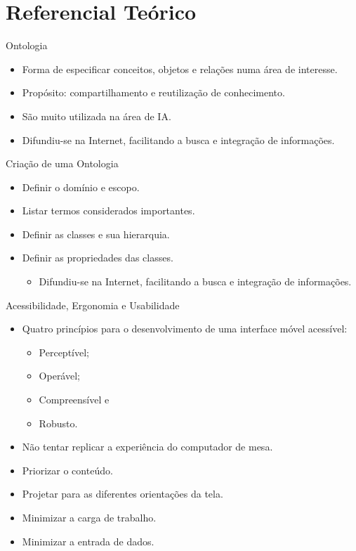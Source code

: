 \section{Referencial Teórico}\label{sec:referencial-teorico}
\begin{frame}[allowframebreaks]{Ontologia}
	\begin{itemize}
		\setlength{\itemsep}{0.5em}
		\item<1-> Forma de especificar conceitos, objetos e relações numa área de interesse.
		\item<1-> Propósito: compartilhamento e reutilização de conhecimento.
		\item<1-> São muito utilizada na área de IA.
		\item<1-> Difundiu-se na Internet, facilitando a busca e integração de informações.
	\end{itemize}
\end{frame}

\begin{frame}[allowframebreaks]{Criação de uma Ontologia}
	\begin{itemize}
		\setlength{\itemsep}{0.5em}
		\item<1-> Definir o domínio e escopo.
		\item<1-> Listar termos considerados importantes.
		\item<1-> Definir as classes e sua hierarquia.
		\item<1-> Definir as propriedades das classes.
		\begin{itemize}
			\setlength{\itemsep}{0.5em}
			\item<1-> Difundiu-se na Internet, facilitando a busca e integração de informações.
		\end{itemize}
	\end{itemize}
\end{frame}

\begin{frame}[allowframebreaks]{Acessibilidade, Ergonomia e Usabilidade}
	\begin{itemize}
		\setlength{\itemsep}{0.5em}
		\item<1-> Quatro princípios para o desenvolvimento de uma interface móvel acessível:
		\begin{itemize}
			\setlength{\itemsep}{0.5em}
			\item<1-> Perceptível;
			\item<1-> Operável;
			\item<1-> Compreensível e
			\item<1-> Robusto.
		\end{itemize}
		\item<1-> Não tentar replicar a experiência do computador de mesa.
		\item<1-> Priorizar o conteúdo.
		\item<1-> Projetar para as diferentes orientações da tela.
		\item<1-> Minimizar a carga de trabalho.
		\item<1-> Minimizar a entrada de dados.
	\end{itemize}
\end{frame}

